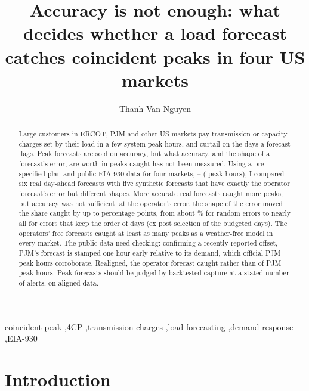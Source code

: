 \documentclass[preprint,12pt,authoryear]{elsarticle}
\begin{document}
\begin{frontmatter}
\title{Accuracy is not enough: what decides whether a load forecast catches coincident peaks in four US markets}
\author{Thanh Van Nguyen}
\address{Tsinghua Shenzhen International Graduate School, Tsinghua University, Shenzhen, China}

\begin{abstract}
Large customers in ERCOT, PJM and other US markets pay transmission or capacity charges set by their load in a few system peak hours, and curtail on the days a forecast flags. Peak forecasts are sold on accuracy, but what accuracy, and the shape of a forecast's error, are worth in peaks caught has not been measured. Using a pre-specified plan and public EIA-930 data for four markets, -- ( peak hours), I compared six real day-ahead forecasts with five synthetic forecasts that have exactly the operator forecast's error but different shapes. More accurate real forecasts caught more peaks, but accuracy was not sufficient: at the operator's error, the shape of the error moved the share caught by up to  percentage points, from about \% for random errors to nearly all for errors that keep the order of days (ex post selection of the budgeted days). The operators' free forecasts caught at least as many peaks as a weather-free model in every market. The public data need checking: confirming a recently reported offset, PJM's forecast is stamped one hour early relative to its demand, which official PJM peak hours corroborate. Realigned, the operator forecast caught  rather than  of  PJM peak hours. Peak forecasts should be judged by backtested capture at a stated number of alerts, on aligned data.
\end{abstract}

\begin{keyword}
coincident peak \sep 4CP \sep transmission charges \sep load forecasting \sep demand response \sep EIA-930
\end{keyword}
\end{frontmatter}

\linenumbers

\section{Introduction}
\end{document}
